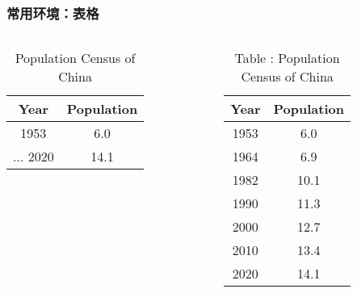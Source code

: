 \begin{frame}[fragile]
\frametitle{常用环境：表格}
\begin{columns}
\begin{column}{0.6\textwidth}
  \begin{texcode}[gobble=4, moretexcs={\toprule,\midrule,\bottomrule},
      emph={[1]table,tabular}, emph={[2]booktabs}]
    \usepackage{booktabs} %
    \begin{table}
      \caption{Population Census of China}
      \label{tab:china-population}
      \begin{tabular}{cc}
        \toprule
          Year & Population \\
        \midrule
          1953 &  6.0 \\
          ...
          2020 & 14.1 \\
        \bottomrule
      \end{tabular}
    \end{table}
  \end{texcode}
\end{column}
\pause
\begin{column}{0.3\textwidth}
  \begin{table}
    \caption{\textcolor{keyword}{Table \thetable:} Population Census of China}
    \label{tab:china-population_}
    \footnotesize
    \begin{tabular}{cc}
      \toprule
        Year & Population \\
      \midrule
        1953 &  6.0 \\
        1964 &  6.9 \\
        1982 & 10.1 \\
        1990 & 11.3 \\
        2000 & 12.7 \\
        2010 & 13.4 \\
        2020 & 14.1 \\
      \bottomrule
    \end{tabular}
  \end{table}
\end{column}
\end{columns}
\end{frame}

